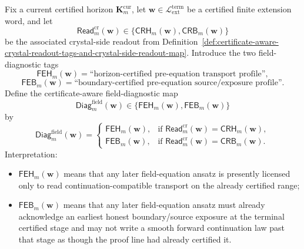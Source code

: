 \begin{definition}
\label{def:certificate-aware-field-diagnostic-tags-and-pre-equation-map}
Fix a current certified horizon \(\mathbf K_m^{\mathrm{cur}}\), let \(\mathbf w\in \mathcal L_{\mathrm{ext}}^{\mathrm{term}}\) be a certified finite extension word, and let
\[
  \mathsf{Read}^{\mathrm{cr}}_{m}(\mathbf w)
  \in
  \{\mathsf{CRH}_{m}(\mathbf w),\mathsf{CRB}_{m}(\mathbf w)\}
\]
be the associated crystal-side readout from Definition~\ref{def:certificate-aware-crystal-readout-tags-and-crystal-side-readout-map}. Introduce the two field-diagnostic tags
\[
  \mathsf{FEH}_{m}(\mathbf w)=\text{``horizon-certified pre-equation transport profile''},
\]
\[
  \mathsf{FEB}_{m}(\mathbf w)=\text{``boundary-certified pre-equation source/exposure profile''}.
\]
Define the certificate-aware field-diagnostic map
\[
  \mathsf{Diag}^{\mathrm{field}}_{m}(\mathbf w)
  \in
  \{\mathsf{FEH}_{m}(\mathbf w),\mathsf{FEB}_{m}(\mathbf w)\}
\]
by
\[
  \mathsf{Diag}^{\mathrm{field}}_{m}(\mathbf w)
  =
  \begin{cases}
    \mathsf{FEH}_{m}(\mathbf w), & \text{if }\mathsf{Read}^{\mathrm{cr}}_{m}(\mathbf w)=\mathsf{CRH}_{m}(\mathbf w),\\[2mm]
    \mathsf{FEB}_{m}(\mathbf w), & \text{if }\mathsf{Read}^{\mathrm{cr}}_{m}(\mathbf w)=\mathsf{CRB}_{m}(\mathbf w).
  \end{cases}
\]
Interpretation:
\begin{itemize}[leftmargin=2em]
  \item \(\mathsf{FEH}_{m}(\mathbf w)\) means that any later field-equation ansatz is presently licensed only to read continuation-compatible transport on the already certified range;
  \item \(\mathsf{FEB}_{m}(\mathbf w)\) means that any later field-equation ansatz must already acknowledge an earliest honest boundary/source exposure at the terminal certified stage and may not write a smooth forward continuation law past that stage as though the proof line had already certified it.
\end{itemize}
\end{definition}

